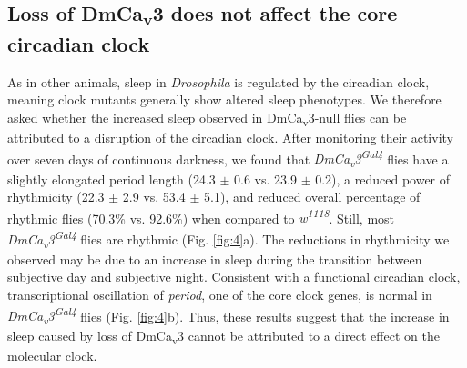 \subsection*{Loss of DmCa\textsubscript{v}3 does not affect the core circadian clock}

As in other animals, sleep in \emph{Drosophila} is regulated by the circadian clock, meaning clock mutants generally show altered sleep phenotypes\cite{hendricks:2003aa, parisky:2008aa}.
We therefore asked whether the increased sleep observed in DmCa\textsubscript{v}3-null flies can be attributed to a disruption of the circadian clock.
After monitoring their activity over seven days of continuous darkness, we found that \emph{DmCa\textsubscript{v}3\textsuperscript{Gal4}} flies have a slightly elongated period length (24.3 $\pm$ 0.6 vs. 23.9 $\pm$ 0.2), a reduced power of rhythmicity (22.3 $\pm$ 2.9 vs. 53.4 $\pm$ 5.1), and reduced overall percentage of rhythmic flies (70.3\% vs. 92.6\%) when compared to \emph{w\textsuperscript{1118}}.
Still, most \emph{DmCa\textsubscript{v}3\textsuperscript{Gal4}} flies are rhythmic (Fig. \ref{fig:4}a).
The reductions in rhythmicity we observed may be due to an increase in sleep during the transition between subjective day and subjective night.
Consistent with a functional circadian clock, transcriptional oscillation of \emph{period}, one of the core clock genes, is normal in \emph{DmCa\textsubscript{v}3\textsuperscript{Gal4}} flies (Fig. \ref{fig:4}b).
Thus, these results suggest that the increase in sleep caused by loss of DmCa\textsubscript{v}3 cannot be attributed to a direct effect on the molecular clock.

